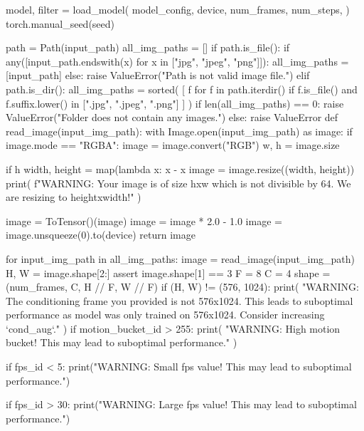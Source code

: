     model, filter = load_model(
        model_config,
        device,
        num_frames,
        num_steps,
    )
    torch.manual_seed(seed)

    path = Path(input_path)
    all_img_paths = []
    if path.is_file():
        if any([input_path.endswith(x) for x in ["jpg", "jpeg", "png"]]):
            all_img_paths = [input_path]
        else:
            raise ValueError("Path is not valid image file.")
    elif path.is_dir():
        all_img_paths = sorted(
            [
                f
                for f in path.iterdir()
                if f.is_file() and f.suffix.lower() in [".jpg", ".jpeg", ".png"]
            ]
        )
        if len(all_img_paths) == 0:
            raise ValueError("Folder does not contain any images.")
    else:
        raise ValueError
    def read_image(input_img_path):
        with Image.open(input_img_path) as image:
            if image.mode == "RGBA":
                image = image.convert("RGB")
            w, h = image.size

            if h %
                width, height = map(lambda x: x - x %
                image = image.resize((width, height))
                print(
                    f"WARNING: Your image is of size {h}x{w} which is not divisible by 64. We are resizing to {height}x{width}!"
                )

            image = ToTensor()(image)
            image = image * 2.0 - 1.0
        image = image.unsqueeze(0).to(device)
        return image

    for input_img_path in all_img_paths:
        image = read_image(input_img_path)
        H, W = image.shape[2:]
        assert image.shape[1] == 3
        F = 8
        C = 4
        shape = (num_frames, C, H // F, W // F)
        if (H, W) != (576, 1024):
            print(
                "WARNING: The conditioning frame you provided is not 576x1024. This leads to suboptimal performance as model was only trained on 576x1024. Consider increasing `cond_aug`."
            )
        if motion_bucket_id > 255:
            print(
                "WARNING: High motion bucket! This may lead to suboptimal performance."
            )

        if fps_id < 5:
            print("WARNING: Small fps value! This may lead to suboptimal performance.")

        if fps_id > 30:
            print("WARNING: Large fps value! This may lead to suboptimal performance.")

